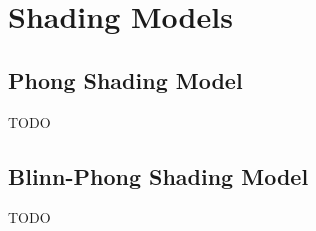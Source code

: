 \chapter{Shading Models}

\section{Phong Shading Model}
TODO

\section{Blinn-Phong Shading Model}
TODO
